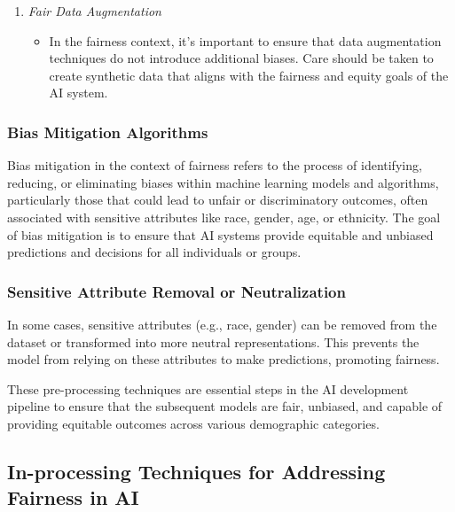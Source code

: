 \documentclass[12pt,a4paper,openright,twoside]{book}
\begin{document}
\begin{enumerate}
\begin{itemize}
    \end{itemize}
    
    \item \emph{Fair Data Augmentation}
    
    \begin{itemize}
    
        \item In the fairness context, it's important to ensure that data augmentation techniques do not introduce additional biases. Care should be taken to create synthetic data that aligns with the fairness and equity goals of the AI system. \cite{10.1145/3531146.3534644}
    
    \end{itemize}

\end{enumerate}

\subsubsection{Bias Mitigation Algorithms}

Bias mitigation in the context of fairness refers to the process of identifying, reducing, or eliminating biases within machine learning models and algorithms, particularly those that could lead to unfair or discriminatory outcomes, often associated with sensitive attributes like race, gender, age, or ethnicity. The goal of bias mitigation is to ensure that AI systems provide equitable and unbiased predictions and decisions for all individuals or groups.

\subsubsection{Sensitive Attribute Removal or Neutralization}

In some cases, sensitive attributes (e.g., race, gender) can be removed from the dataset or transformed into more neutral representations. This prevents the model from relying on these attributes to make predictions, promoting fairness. \cite{NEURIPS2021_64ff7983}

These pre-processing techniques are essential steps in the AI development pipeline to ensure that the subsequent models are fair, unbiased, and capable of providing equitable outcomes across various demographic categories.

\subsection{In-processing Techniques for Addressing Fairness in AI}
\end{document}

